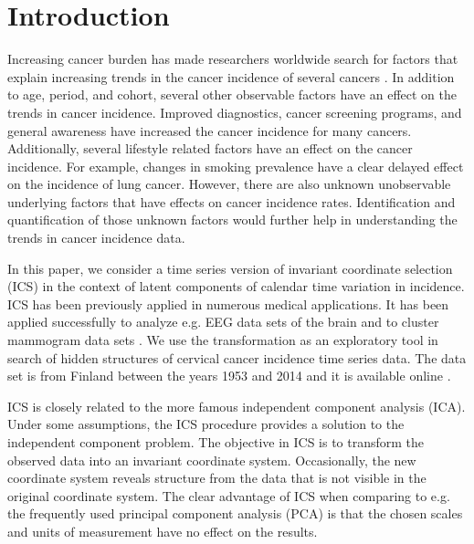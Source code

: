 \documentclass{llncs}
\begin{document}
\section{Introduction}\label{intro}
Increasing cancer burden has made researchers worldwide search for factors that explain increasing trends in the cancer incidence of several cancers \citep{parkin2011}. In addition to age, period, and cohort, several other observable factors have an effect on the trends in cancer incidence. Improved diagnostics,  cancer screening programs, and general awareness have increased the  cancer incidence for many cancers. Additionally, several lifestyle related factors have an effect on the cancer incidence. For example, changes in smoking prevalence have a clear delayed effect on the incidence of lung cancer. However, there are also unknown unobservable underlying factors that have effects on cancer incidence rates. Identification and quantification of those unknown factors would further help in understanding the trends in cancer incidence data.

In this paper, we consider a time series version of invariant coordinate selection (ICS) in the context of latent components of calendar time variation in incidence. ICS has been previously applied in numerous medical applications. It has been applied successfully to analyze e.g. EEG data sets of the brain \cite{joyce2004} and to cluster mammogram data sets \cite{gallardo2012}.
We use the transformation as an exploratory tool in search of hidden structures of cervical cancer incidence time
series data. The data set is from Finland between the years 1953 and 2014 and it is available online \cite{engholm2010}.

ICS is closely related to the more famous independent component analysis (ICA). Under some assumptions, the ICS procedure provides a solution to the independent component problem. The objective in ICS is to transform the observed data into an invariant coordinate system. Occasionally,  the new coordinate system reveals structure from the data that is not visible in the original coordinate system. The clear advantage of ICS when comparing to e.g. the frequently used principal component analysis (PCA) is that the chosen scales and units of measurement have no effect on the results. 

\end{document}

